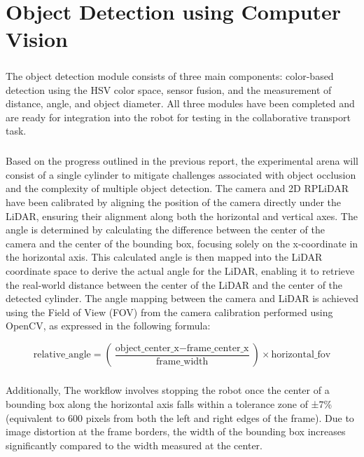 \chapter{Object Detection using Computer Vision}

\paragraph*{}
The object detection module consists of three main components: color-based detection using the HSV color space, sensor fusion, and the measurement of distance, angle, and object diameter. All three modules have been completed and are ready for integration into the robot for testing in the collaborative transport task.

\paragraph*{}
Based on the progress outlined in the previous report, the experimental arena will consist of a single cylinder to mitigate challenges associated with object occlusion and the complexity of multiple object detection. The camera and 2D RPLiDAR have been calibrated by aligning the position of the camera directly under the LiDAR, ensuring their alignment along both the horizontal and vertical axes. The angle is determined by calculating the difference between the center of the camera and the center of the bounding box, focusing solely on the x-coordinate in the horizontal axis. This calculated angle is then mapped into the LiDAR coordinate space to derive the actual angle for the LiDAR, enabling it to retrieve the real-world distance between the center of the LiDAR and the center of the detected cylinder. The angle mapping between the camera and LiDAR is achieved using the Field of View (FOV) from the camera calibration performed using OpenCV, as expressed in the following formula:

\[
\text{relative\_angle} = \left( \frac{\text{object\_center\_x} - \text{frame\_center\_x}}{\text{frame\_width}} \right) \times \text{horizontal\_fov}
\]

\paragraph*{}
Additionally, The workflow involves stopping the robot once the center of a bounding box along the horizontal axis falls within a tolerance zone of ±7\% (equivalent to 600 pixels from both the left and right edges of the frame). Due to image distortion at the frame borders, the width of the bounding box increases significantly compared to the width measured at the center.

